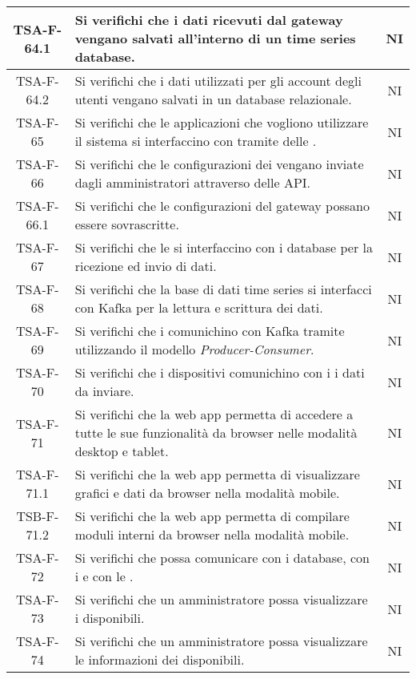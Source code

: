 \begin{center}
\begin{longtable}{|c|p{10cm}|c|}
			 \hline
			 TSA-F-64.1 & Si verifichi che i dati ricevuti dal gateway vengano salvati all'interno di un time series database. & NI \\
			 \hline
			 TSA-F-64.2 & Si verifichi che i dati utilizzati per gli account degli utenti vengano salvati in un database relazionale. & NI \\
			 \hline
			 TSA-F-65 & Si verifichi che le applicazioni che vogliono utilizzare il sistema si interfaccino con \glock{Kafka} tramite delle \glock{API}. & NI \\
			 \hline
			 TSA-F-66 & Si verifichi che le configurazioni dei \glock{gateway} vengano inviate dagli amministratori attraverso delle API. & NI \\
			 \hline
			 TSA-F-66.1 & Si verifichi che le configurazioni del gateway possano essere sovrascritte. & NI \\
			 \hline
			 TSA-F-67 & Si verifichi che le \glock{API} si interfaccino con i database per la ricezione ed invio di dati. & NI \\
			 \hline
			 TSA-F-68 & Si verifichi che la base di dati time series si interfacci con Kafka per la lettura e scrittura dei dati. & NI \\
			 \hline
			 TSA-F-69 & Si verifichi che i \glock{gateway} comunichino con Kafka tramite \glock{topic} utilizzando il modello \textit{Producer-Consumer}. & NI \\
			 \hline
			 TSA-F-70 & Si verifichi che i dispositivi comunichino con i \glock{gateway} i dati da inviare. & NI \\
			 \hline
			 TSA-F-71 & Si verifichi che la web app permetta di accedere a tutte le sue funzionalità da browser nelle modalità desktop e tablet. & NI \\
			 \hline
			 TSA-F-71.1 & Si verifichi che la web app permetta di visualizzare grafici e dati da browser nella modalità mobile. & NI \\
			 \hline
			 TSB-F-71.2 & Si verifichi che la web app permetta di compilare moduli interni da browser nella modalità mobile. & NI \\
			 \hline
			 TSA-F-72 & Si verifichi che \glock{Kafka} possa comunicare con i database, con i \glock{gateway} e con le \glock{API}. & NI \\
			 \hline
			 TSA-F-73 & Si verifichi che un amministratore possa visualizzare i \glock{gateway} disponibili. & NI \\
			 \hline
			 TSA-F-74 & Si verifichi che un amministratore possa visualizzare le informazioni dei \glock{gateway} disponibili. & NI \\

\end{longtable}
\end{center}
